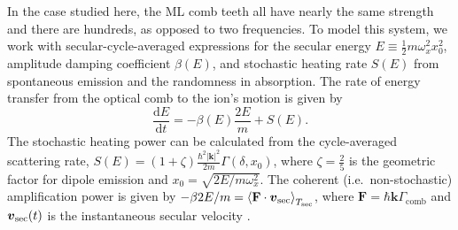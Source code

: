 \documentclass[preprint,superscriptaddress,amsmath,amssymb,aps,prl]{revtex4-1}
\begin{document}
In the case studied here, the ML comb teeth all have nearly the same strength and there are hundreds, as opposed to two frequencies. To model this system, we work with secular-cycle-averaged expressions for the secular energy $E\equiv \frac{1}{2}m \omega_x^2 x_0^2$, amplitude damping coefficient $\beta(E)$, and stochastic heating rate $S(E)$ from spontaneous emission and the randomness in absorption.  The rate of energy transfer from the optical comb to the ion's motion is given by
\begin{equation}
\frac{\mathrm{d}E}{\mathrm{d}t} = -\beta(E) \frac{2E}{m} + S(E). \label{eqn:PowerBalance}
\end{equation}
The stochastic heating power can be calculated from the cycle-averaged scattering rate, $S(E) = (1 + \zeta)\frac{\hbar^2 |\mathbf{k}|^2}{2 m} \Gamma(\delta, x_0)$, where $\zeta = \frac{2}{5}$ is the geometric factor for dipole emission \cite{Leibfried2003quantum} and $x_0 = \sqrt{2E/m \omega_x^2}$.  The coherent (i.e.~non-stochastic) amplification power is given by $-\beta 2 E/m = \left\langle\mathbf{F}\cdot \mbox{\boldmath$v$}_\mathrm{sec}\right \rangle_{T_\mathrm{sec}}$, where $\mathbf{F} = \hbar \mathbf{k} \Gamma_\mathrm{comb}$ and $\mbox{\boldmath$v$}_\mathrm{sec}(t)$ is the instantaneous secular velocity \cite{SupplementalMaterials}.
\end{document}

